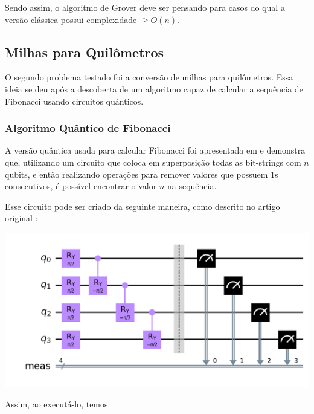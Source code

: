 \documentclass{article}
\begin{document}
Sendo assim, o algoritmo de Grover deve ser pensando para casos do qual a versão clássica possui complexidade $\ge O(n)$.


\subsection{Milhas para Quilômetros} \label{conversion}

O segundo problema testado foi a conversão de milhas para quilômetros. Essa ideia se deu após a descoberta de um algoritmo capaz de calcular a sequência de Fibonacci usando circuitos quânticos.

\subsubsection{Algoritmo Quântico de Fibonacci}

A versão quântica usada para calcular Fibonacci foi apresentada em \cite{gilliam2020canonical} e  demonstra que, utilizando um circuito que coloca em superposição todas as bit-strings com $n$ qubits, e então realizando operações para remover valores que possuem $1$s consecutivos, é possível encontrar o valor $n$ na sequência.

Esse circuito pode ser criado da seguinte maneira, como descrito no artigo original \cite{gilliam2020canonical}:

\begin{center}
	\includegraphics[scale=0.3]{fibonacci-circuit.png}
	\label{fig:fibonacci-circuit}
\end{center}

Assim, ao executá-lo, temos:
\end{document}
